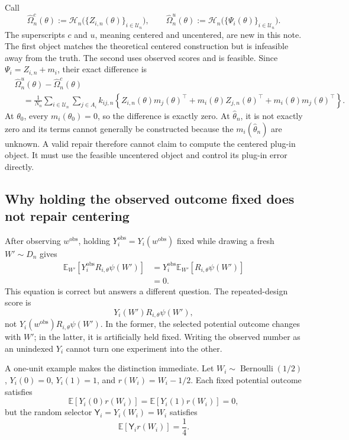 \documentclass[11pt]{article}
\newcommand{\E}{\mathbb E}
\newcommand{\obs}{\mathrm{obs}}
\begin{document}
Call
\[
 \widehat\Omega_n^c(\theta)
 :=\mathcal H_n\bigl(\{Z_{i,n}(\theta)\}_{i\in\mathcal U_n}\bigr),
 \qquad
 \widehat\Omega_n^u(\theta)
 :=\mathcal H_n\bigl(\{\Psi_i(\theta)\}_{i\in\mathcal U_n}\bigr).
\]
The superscripts \(c\) and \(u\), meaning centered and uncentered, are new in
this note. The first object matches the theoretical centered construction but
is infeasible away from the truth. The second uses observed scores and is
feasible. Since \(\Psi_i=Z_{i,n}+m_i\), their exact difference is
\begin{align}
 &\widehat\Omega_n^u(\theta)-\widehat\Omega_n^c(\theta) \\
 &\quad=\frac{1}{N_n}
   \sum_{i\in\mathcal U_n}\sum_{j\in A_i}k_{ij,n}
   \left\{
     Z_{i,n}(\theta)m_j(\theta)^\top
     +m_i(\theta)Z_{j,n}(\theta)^\top
     +m_i(\theta)m_j(\theta)^\top
   \right\}.
 \label{eq:centered-uncentered-gap}
\end{align}
At \(\theta_0\), every \(m_i(\theta_0)=0\), so the difference is exactly zero.
At \(\widehat\theta_n\), it is not exactly zero and its terms cannot generally
be constructed because the \(m_i(\widehat\theta_n)\) are unknown. A valid
repair therefore cannot claim to compute the centered plug-in object. It must
use the feasible uncentered object and control its plug-in error directly.

\subsection{Why holding the observed outcome fixed does not repair centering}

After observing \(w^{\obs}\), holding \(Y_i^{\obs}=Y_i(w^{\obs})\) fixed while
drawing a fresh \(W'\sim D_n\) gives
\begin{align}
 \E_{W'}[Y_i^{\obs}R_{i,\theta}\psi(W')]
 &=Y_i^{\obs}\E_{W'}[R_{i,\theta}\psi(W')] \\
 &=0.
 \label{eq:hybrid-zero}
\end{align}
This equation is correct but answers a different question. The repeated-design
score is
\[
 Y_i(W')R_{i,\theta}\psi(W'),
\]
not \(Y_i(w^{\obs})R_{i,\theta}\psi(W')\). In the former, the selected potential
outcome changes with \(W'\); in the latter, it is artificially held fixed.
Writing the observed number as an unindexed \(Y_i\) cannot turn one experiment
into the other.

A one-unit example makes the distinction immediate. Let
\(W_i\sim\operatorname{Bernoulli}(1/2)\), \(Y_i(0)=0\), \(Y_i(1)=1\), and
\(r(W_i)=W_i-1/2\). Each fixed potential outcome satisfies
\[
 \E[Y_i(0)r(W_i)]=\E[Y_i(1)r(W_i)]=0,
\]
but the random selector \(\mathsf{Y}_i=Y_i(W_i)=W_i\) satisfies
\[
 \E[\mathsf{Y}_ir(W_i)]=\frac14.
\]
\end{document}
